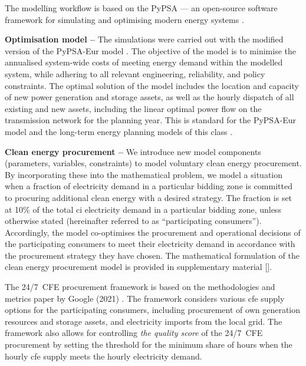 The modelling workflow is based on the PyPSA --- an open-source software framework for simulating and optimising modern energy systems \cite{brownPyPSAPythonPower2018}. 

\textbf{Optimisation model --} The simulations were carried out with the modified version of the PyPSA-Eur model \cite{PyPSA-Eur-github}. 
The objective of the model is to minimise the annualised system-wide costs of meeting energy demand within the modelled system, while adhering to all relevant engineering, reliability, and policy constraints.
The optimal solution of the model includes the location and capacity of new power generation and storage assets, as well as the hourly dispatch of all existing and new assets, including the linear optimal power flow on the transmission network for the planning year. This is standard for the PyPSA-Eur model \cite{horschPyPSAEurOpenOptimisation2018} and the long-term energy planning models of this class \cite{jenkinsGenX2022, howellsOSeMOSYSOpenSource2011}.

\textbf{Clean energy procurement --} We introduce new model components (parameters, variables, constraints) to model voluntary clean energy procurement.
By incorporating these into the mathematical problem, we model a situation when a fraction of electricity demand in a particular bidding zone is committed to procuring additional clean energy with a desired strategy.
The fraction is set at 10\% of the total \gls{ci} electricity demand in a particular bidding zone, unless otherwise stated (hereinafter referred to as \enquote{participating consumers}).
Accordingly, the model co-optimises the procurement and operational decisions of the participating consumers to meet their electricity demand in accordance with the procurement strategy they have chosen.
The mathematical formulation of the clean energy procurement model is provided in supplementary material [].

The 24/7~CFE procurement framework is based on the methodologies and metrics paper by Google (2021) \cite{google-methodologies}.
The framework considers various \gls{cfe} supply options for the participating consumers, including procurement of own generation resources and storage assets, and electricity imports from the local grid.
The framework also allows for controlling \textit{the quality score} of the 24/7~CFE procurement by setting the threshold for the minimum share of hours when the hourly \gls{cfe} supply meets the hourly electricity demand. 

